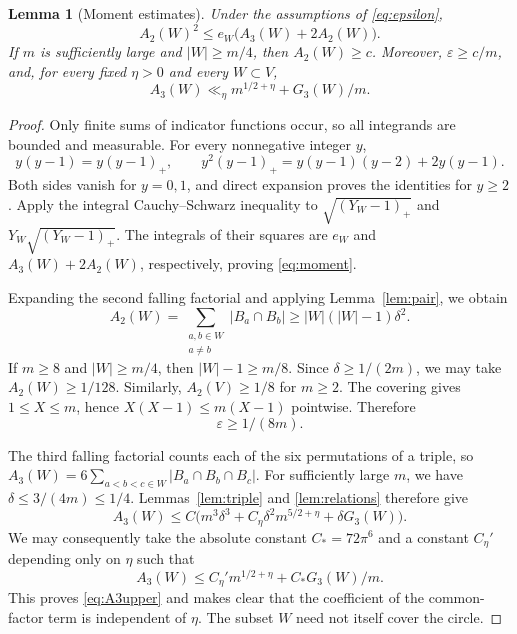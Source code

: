 \documentclass[12pt,leqno]{article}
\numberwithin{equation}{section}
\newtheorem{lemma}[theorem]{Lemma}
\theoremstyle{remark}
\begin{document}
\begin{lemma}[Moment estimates]\label{lem:moments}
Under the assumptions of \eqref{eq:epsilon},
\begin{equation}\label{eq:moment}
A_2(W)^2\le e_W\bigl(A_3(W)+2A_2(W)\bigr).
\end{equation}
If $m$ is sufficiently large and $|W|\ge m/4$, then $A_2(W)\ge c$. Moreover, $\varepsilon\ge c/m$, and, for every fixed $\eta>0$ and every $W\subset V$,
\begin{equation}\label{eq:A3upper}
A_3(W)\ll_\eta m^{1/2+\eta}+G_3(W)/m.
\end{equation}
\end{lemma}
\begin{proof}
Only finite sums of indicator functions occur, so all integrands are bounded and measurable. For every nonnegative integer $y$,
\[
y(y-1)=y(y-1)_+,\qquad
y^2(y-1)_+=y(y-1)(y-2)+2y(y-1).
\]
Both sides vanish for $y=0,1$, and direct expansion proves the identities for $y\ge2$. Apply the integral Cauchy--Schwarz inequality to
$\sqrt{(Y_W-1)_+}$ and $Y_W\sqrt{(Y_W-1)_+}$. The integrals of their squares are $e_W$ and $A_3(W)+2A_2(W)$, respectively, proving \eqref{eq:moment}.

Expanding the second falling factorial and applying Lemma~\ref{lem:pair}, we obtain
\[
A_2(W)=\sum_{\substack{a,b\in W\\a\ne b}}|B_a\cap B_b|
\ge |W|(|W|-1)\delta^2.
\]
If $m\ge8$ and $|W|\ge m/4$, then $|W|-1\ge m/8$. Since $\delta\ge1/(2m)$, we may take $A_2(W)\ge1/128$. Similarly, $A_2(V)\ge1/8$ for $m\ge2$. The covering gives $1\le X\le m$, hence $X(X-1)\le m(X-1)$ pointwise. Therefore
\begin{equation}\label{eq:epslower}
\varepsilon\ge1/(8m).
\end{equation}

The third falling factorial counts each of the six permutations of a triple, so
$A_3(W)=6\sum_{a<b<c\in W}|B_a\cap B_b\cap B_c|$.
For sufficiently large $m$, we have $\delta\le3/(4m)\le1/4$. Lemmas~\ref{lem:triple} and \ref{lem:relations} therefore give
\[
A_3(W)\le C\bigl(m^3\delta^3
+C_\eta\delta^2m^{5/2+\eta}+\delta G_3(W)\bigr).
\]
We may consequently take the absolute constant $C_*=72\pi^6$ and a constant $C_\eta'$ depending only on $\eta$ such that
\begin{equation}\label{eq:A3constants}
A_3(W)\le C_\eta' m^{1/2+\eta}+C_*G_3(W)/m.
\end{equation}
This proves \eqref{eq:A3upper} and makes clear that the coefficient of the common-factor term is independent of $\eta$. The subset $W$ need not itself cover the circle.
\end{proof}
\end{document}

